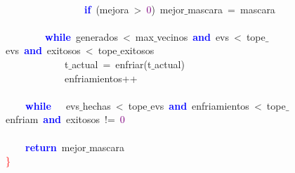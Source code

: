 \mbox{} \\
\mbox{}\ \ \ \ \ \ \ \ \ \ \ \ \ \ \ \ \textbf{\textcolor{Blue}{if}}\ \textcolor{BrickRed}{(}mejora\ \textcolor{BrickRed}{\textgreater{}}\ \textcolor{Purple}{0}\textcolor{BrickRed}{)}\ mejor$\_$mascara\ \textcolor{BrickRed}{=}\ mascara \\
\mbox{} \\
\mbox{}\ \ \ \ \ \ \ \ \textbf{\textcolor{Blue}{while}}\ generados\ \textcolor{BrickRed}{\textless{}}\ max$\_$vecinos\ \textbf{\textcolor{Blue}{and}}\ evs\ \textcolor{BrickRed}{\textless{}}\ tope$\_$evs\ \textbf{\textcolor{Blue}{and}}\ exitosos\ \textcolor{BrickRed}{\textless{}}\ tope$\_$exitosos \\
\mbox{}\ \ \ \ \ \ \ \ \ \ \ \ t$\_$actual\ \textcolor{BrickRed}{=}\ enfriar\textcolor{BrickRed}{(}t$\_$actual\textcolor{BrickRed}{)} \\
\mbox{}\ \ \ \ \ \ \ \ \ \ \ \ enfriamientos\textcolor{BrickRed}{++} \\
\mbox{} \\
\mbox{}\ \ \ \ \textbf{\textcolor{Blue}{while}}\ \ \ evs$\_$hechas\ \textcolor{BrickRed}{\textless{}}\ tope$\_$evs\ \textbf{\textcolor{Blue}{and}}\ enfriamientos\ \textcolor{BrickRed}{\textless{}}\ tope$\_$enfriam\ \textbf{\textcolor{Blue}{and}}\ exitosos\ \textcolor{BrickRed}{!=}\ \textcolor{Purple}{0} \\
\mbox{} \\
\mbox{}\ \ \ \ \textbf{\textcolor{Blue}{return}}\ mejor$\_$mascara \\
\mbox{}\textcolor{Red}{\}} \\
\mbox{}
